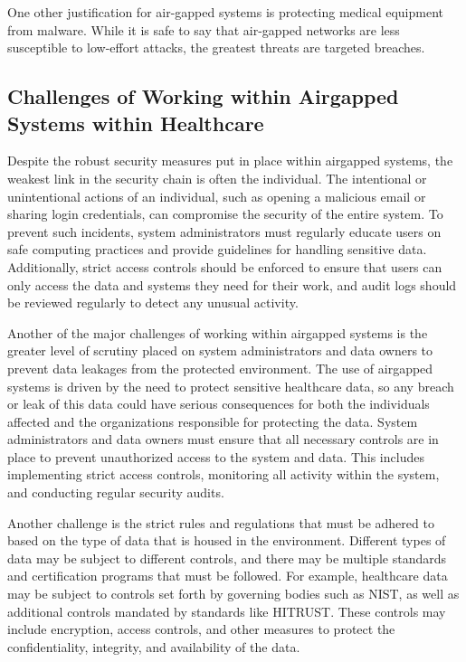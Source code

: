 \documentclass{amia}
\begin{document}
One other justification for air-gapped systems is protecting medical equipment from malware. While it is safe to say that air-gapped networks are less susceptible to low-effort attacks, the greatest threats are targeted breaches.

\subsection*{Challenges of Working within Airgapped Systems within Healthcare}

Despite the robust security measures put in place within airgapped systems, the weakest link in the security chain is often the individual. The intentional or unintentional actions of an individual, such as opening a malicious email or sharing login credentials, can compromise the security of the entire system. To prevent such incidents, system administrators must regularly educate users on safe computing practices and provide guidelines for handling sensitive data. Additionally, strict access controls should be enforced to ensure that users can only access the data and systems they need for their work, and audit logs should be reviewed regularly to detect any unusual activity.

Another of the major challenges of working within airgapped systems is the greater level of scrutiny placed on system administrators and data owners to prevent data leakages from the protected environment. The use of airgapped systems is driven by the need to protect sensitive healthcare data, so any breach or leak of this data could have serious consequences for both the individuals affected and the organizations responsible for protecting the data. System administrators and data owners must ensure that all necessary controls are in place to prevent unauthorized access to the system and data. This includes implementing strict access controls, monitoring all activity within the system, and conducting regular security audits.

Another challenge is the strict rules and regulations that must be adhered to based on the type of data that is housed in the environment. Different types of data may be subject to different controls, and there may be multiple standards and certification programs that must be followed. For example, healthcare data may be subject to controls set forth by governing bodies such as NIST, as well as additional controls mandated by standards like HITRUST. These controls may include encryption, access controls, and other measures to protect the confidentiality, integrity, and availability of the data.
\end{document}

